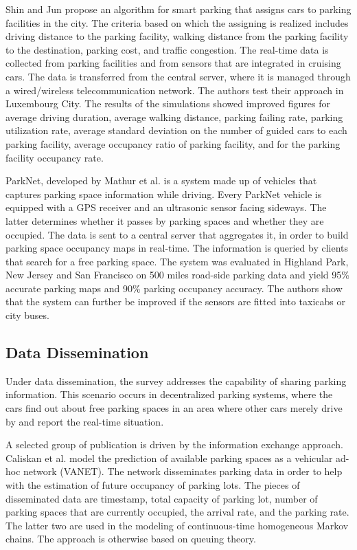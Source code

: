 \documentclass{ws-ijait}
\newcommand{\cmmnt}[1]{\ignorespaces}
\begin{document}
	Shin and Jun \cmmnt{ref shin} propose an algorithm for smart parking that assigns cars to parking facilities in the city. The criteria based on which the assigning is realized includes driving distance to the parking facility, walking distance from the parking facility to the destination, parking cost, and traffic congestion. The real-time data is collected from parking facilities and from sensors that are integrated in cruising cars. The data is transferred from the central server, where it is managed through a wired/wireless telecommunication network. The authors test their approach in Luxembourg City. The results of the simulations showed improved figures for average driving duration, average walking distance, parking failing rate, parking utilization rate, average standard deviation on the number of guided cars to each parking facility, average occupancy ratio of parking facility, and for the parking facility occupancy rate. 
	
	ParkNet, developed by Mathur et al. \cmmnt{ref mathur} is a system made up of vehicles that captures parking space information while driving. Every ParkNet vehicle is equipped with a GPS receiver and an ultrasonic sensor facing sideways. The latter determines whether it passes by parking spaces and whether they are occupied. The data is sent to a central server that aggregates it, in order to build parking space occupancy maps in real-time. The information is queried by clients that search for a free parking space. The system was evaluated in Highland Park, New Jersey and San Francisco on 500 miles road-side parking data and yield 95\% accurate parking maps and 90\% parking occupancy accuracy. The authors show that the system can further be improved if the sensors are fitted into taxicabs or city buses.
	
	\subsection{Data Dissemination}
	Under data dissemination, the survey addresses the capability of sharing parking information. This scenario occurs in decentralized parking systems, where the cars find out about free parking spaces in an area where other cars merely drive by and report the real-time situation. 
	
	A selected group of publication is driven by the information exchange approach. Caliskan et al. \cmmnt{ref caliskan} model the prediction of available parking spaces as a vehicular ad-hoc network (VANET). The network disseminates parking data in order to help with the estimation of future occupancy of parking lots. The pieces of disseminated data are timestamp, total capacity of parking lot, number of parking spaces that are currently occupied, the arrival rate, and the parking rate. The latter two are used in the modeling of continuous-time homogeneous Markov chains. The approach is otherwise based on queuing theory. 
	
\end{document}
